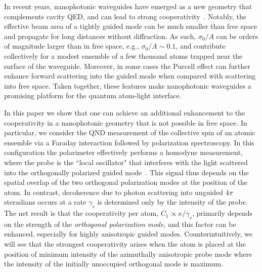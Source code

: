 \documentclass[preprint,aps,pra,onecolumn,superscriptaddress]{revtex4-1} %
\begin{document}
In recent years, nanophotonic waveguides have emerged as a new geometry that complements cavity QED, and can lead to strong cooperativity~\cite{Vetsch2010Optical, Chang2013,  Hung2013, Yu2014,  Douglas2015, Asenjo-Garcia2017Exponential, Qi2016}.  Notably, the effective beam area of a tightly guided mode can be much smaller than free space and propagate for long distances without diffraction.  As such,  $\sigma_0/A$ can be orders of magnitude larger than in free space, e.g., $\sigma_0/A \sim 0.1$, and contribute collectively for a modest ensemble of a few thousand atoms trapped near the surface of the waveguide.  Moreover, in some cases the Purcell effect can further enhance forward scattering into the guided mode when compared with scattering into free space.  Taken together, these features make  nanophotonic waveguides a promising platform for the quantum atom-light interface.  
 
In this paper we show that one can achieve an additional enhancement to the cooperativity in a nanophotonic geometry that is not possible in free space. In particular, we consider the QND measurement of the collective spin of an atomic ensemble via a Faraday interaction followed by polarization spectroscopy.  In this configuration the polarimeter effectively performs a homodyne measurement, where the probe is the ``local oscillator" that interferes with the light scattered into the orthogonally polarized guided mode~\cite{Baragiola2014}.   This signal thus depends on the spatial overlap of the two orthogonal polarization modes at the position of the atom.  In contrast, decoherence due to photon scattering into unguided $4 \pi$ steradians occurs at a rate $\gamma_s$ is determined only by the intensity of the probe.   The net result is that the cooperativity per atom, $C_1 \propto \kappa/\gamma_s$, primarily depends on the strength of the {\em orthogonal polarization mode}, and this factor can be enhanced, especially for highly anisotropic guided modes.  Counterintuitively, we will see that the strongest cooperativity arises when the atom is placed at the position of  minimum intensity of the azimuthally anisotropic probe mode where the intensity of the initially unoccupied orthogonal mode is maximum. 
\end{document}
